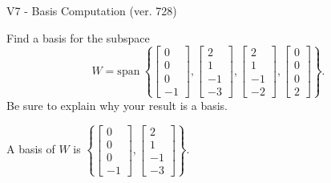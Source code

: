 \begin{exercise}
  \begin{exerciseTitle}V7 - Basis Computation (ver. 728)\end{exerciseTitle}
  \begin{exerciseStatement}
    Find a basis for the subspace 
\[W=\mathrm{span}\ \left\{\left[\begin{array}{r}
0 \\
0 \\
0 \\
-1
\end{array}\right] , \left[\begin{array}{r}
2 \\
1 \\
-1 \\
-3
\end{array}\right] , \left[\begin{array}{r}
2 \\
1 \\
-1 \\
-2
\end{array}\right] , \left[\begin{array}{r}
0 \\
0 \\
0 \\
2
\end{array}\right]\right\}.\]
 Be sure to explain why your result is a basis.


  \end{exerciseStatement}
  \begin{exerciseAnswer}
   A basis of \(W\) is  \(\left\{\left[\begin{array}{r}
0 \\
0 \\
0 \\
-1
\end{array}\right] , \left[\begin{array}{r}
2 \\
1 \\
-1 \\
-3
\end{array}\right]\right\}\).
  


  \end{exerciseAnswer}
\end{exercise}